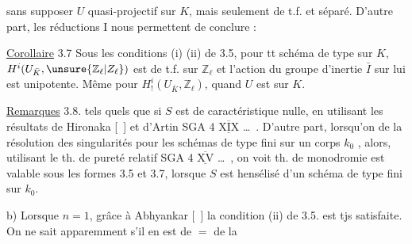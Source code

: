 sans supposer $U$ quasi-projectif sur $K$, mais seulement de t.f. et séparé. D'autre part, les réductions   I nous permettent de conclure :

\uline{Corollaire} 3.7 Sous les conditions (i) (ii) de 3.5, pour tt schéma  de type  sur $K$, $H^i(U_{\bar K},\unsure{\mathbb Z_\ell|Z_\ell})$ est de t.f. sur $\mathbb Z_\ell$ et l'action du groupe d'inertie $\bar I$ sur  lui est  unipotente. Même  pour $H^i_!(U_{\bar K},\mathbb Z_\ell)$, quand $U$ est   sur $K$.

\uline{Remarques} 3.8.    tels quels que si $S$ est de caractéristique nulle,  en utilisant les résultats de Hironaka [\ ] et d'Artin SGA 4 $\overline{\underline{\mathrm{XIX}}}$ \ldots\ . D'autre part,  lorsqu'on  de la résolution des singularités  pour les schémas de type fini sur un corps $k_0$ , alors, utilisant le th. de pureté relatif SGA 4 $\overline{\underline{\mathrm{XV}}}$ \ldots\ , on voit   th. de monodromie est valable   sous les formes 3.5 et 3.7, lorsque $S$ est  hensélisé  d'un schéma de type fini sur  $k_0$.

 b) Lorsque $n=1$,  grâce à Abhyankar [\ ] la condition (ii) de 3.5. est tjs satisfaite. On ne sait apparemment s'il en est de $=$ de la

